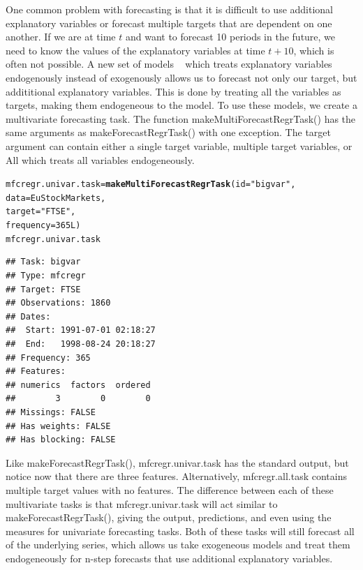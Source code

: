 \documentclass[12pt]{article}\usepackage[]{graphicx}\usepackage[]{color}
\makeatletter
\newcommand{\hlnum}[1]{\textcolor[rgb]{0.686,0.059,0.569}{#1}}%
\newcommand{\hlstr}[1]{\textcolor[rgb]{0.192,0.494,0.8}{#1}}%
\newcommand{\hlstd}[1]{\textcolor[rgb]{0.345,0.345,0.345}{#1}}%
\newcommand{\hlkwb}[1]{\textcolor[rgb]{0.69,0.353,0.396}{#1}}%
\newcommand{\hlkwc}[1]{\textcolor[rgb]{0.333,0.667,0.333}{#1}}%
\newcommand{\hlkwd}[1]{\textcolor[rgb]{0.737,0.353,0.396}{\textbf{#1}}}%
\newenvironment{kframe}{%
 \def\at@end@of@kframe{}%
 \ifinner\ifhmode%
  \def\at@end@of@kframe{\end{minipage}}%
  \begin{minipage}{\columnwidth}%
 \fi\fi%
 \def\FrameCommand##1{\hskip\@totalleftmargin \hskip-\fboxsep
 \colorbox{shadecolor}{##1}\hskip-\fboxsep
     \hskip-\linewidth \hskip-\@totalleftmargin \hskip\columnwidth}%
 \MakeFramed {\advance\hsize-\width
   \@totalleftmargin\z@ \linewidth\hsize
   \@setminipage}}%
 {\par\unskip\endMakeFramed%
 \at@end@of@kframe}
\newenvironment{knitrout}{}{} %
\theoremstyle{definition}
\newcommand\code{\@codex}
\def\@codex#1{{\normalfont\ttfamily\hyphenchar\font=-1 #1}}
\makeatother
\begin{document}
One common problem with forecasting is that it is difficult to use additional explanatory variables or forecast multiple targets that are dependent on one another. If we are at time $t$ and want to forecast 10 periods in the future, we need to know the values of the explanatory variables at time $t+10$, which is often not possible. A new set of models ~\cite{BigVAR} which treats explanatory variables endogenously instead of exogenously allows us to forecast not only our target, but addititional explanatory variables. This is done by treating all the variables as targets, making them endogeneous to the model. To use these models, we create a multivariate forecasting task. The function \code{makeMultiForecastRegrTask()} has the same arguments as \code{makeForecastRegrTask()} with one exception. The \code{target} argument can contain either a single target variable, multiple target variables, or \code{All} which treats all variables endogeneously.
\singlespacing
\begin{knitrout}
\color{fgcolor}\begin{kframe}
\begin{alltt}
\hlstd{mfcregr.univar.task} \hlkwb{=} \hlkwd{makeMultiForecastRegrTask}\hlstd{(}\hlkwc{id} \hlstd{=} \hlstr{"bigvar"}\hlstd{,}
                                                \hlkwc{data} \hlstd{= EuStockMarkets,}
                                                \hlkwc{target} \hlstd{=} \hlstr{"FTSE"}\hlstd{,}
                                                \hlkwc{frequency} \hlstd{=} \hlnum{365L}\hlstd{)}
\hlstd{mfcregr.univar.task}
\end{alltt}
\begin{verbatim}
## Task: bigvar
## Type: mfcregr
## Target: FTSE
## Observations: 1860
## Dates:
##  Start: 1991-07-01 02:18:27 
##  End:   1998-08-24 20:18:27
## Frequency: 365
## Features:
## numerics  factors  ordered 
##        3        0        0 
## Missings: FALSE
## Has weights: FALSE
## Has blocking: FALSE
\end{verbatim}
\end{kframe}
\end{knitrout}
\doublespacing

Like \code{makeForecastRegrTask()}, \code{mfcregr.univar.task} has the standard output, but notice now that there are three features. Alternatively, \code{mfcregr.all.task} contains multiple target values with no features. The difference between each of these multivariate tasks is that \code{mfcregr.univar.task} will act similar to \code{makeForecastRegrTask()}, giving the output, predictions, and even using the measures for univariate forecasting tasks. Both of these tasks will still forecast all of the underlying series, which allows us take exogeneous models and treat them endogeneously for n-step forecasts that use additional explanatory variables.
\end{document}
